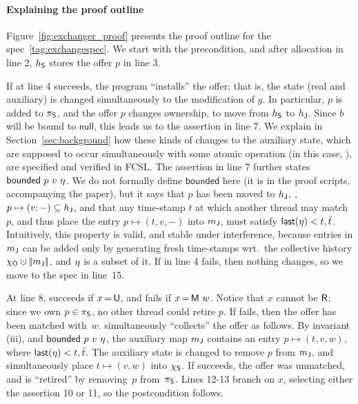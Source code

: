 %

\paragraph{Explaining the proof outline}

Figure~\ref{fig:exchanger_proof} presents the proof outline for the
spec~\eqref{tag:exchangespec}.
%
We start with the precondition, and after allocation in line 2,
$h_{\mathsf{S}}$ stores the offer $p$ in line 3.

If  at line 4 succeeds, the program ``installs'' the offer;
that is, the state (real and auxiliary) is changed simultaneously to
the modification of $g$. In particular, $p$ is added to $\pi_{\mathsf{S}}$, and
the offer $p$ changes ownership, to move from $h_{\mathsf{S}}$ to $h_{\mathsf{J}}$.
Since $b$ will be bound to $\mathsf{null}$, this leads us to the
assertion in line 7. We explain in Section~\ref{sec:background} how
these kinds of changes to the auxiliary state, which are supposed to
occur simultaneously with some atomic operation (in this case,
), are specified and verified in FCSL. The assertion in line
7 further states $\mathsf{bounded}\ p\ v\ \eta$. We do not formally
define $\mathsf{bounded}$ here (it is in the proof scripts,
accompanying the paper), but it says that $p$ has been moved to
$h_{\mathsf{J}}$, \ie, $p \mapsto (v; -) \subseteq h_{\mathsf{J}}$, and that any
time-stamp $t$ at which another thread may match $p$, and thus place
the entry $p \mapsto (t, v,-)$ into ${m_{\mathsf{J}}}$, must satisfy
$\mathsf{last}(\eta) < t, \bar{t}$. Intuitively, this property is
valid, and stable under interference, because entries in ${m_{\mathsf{J}}}$
can be added only by generating fresh time-stamps wrt.~the collective
history $\histo \hunion \mygather{\pending}$, and $\eta$ is a subset
of it.
%
If  in line 4 fails, then nothing changes, so we move to the
spec in line~15.

At line 8,  succeeds if $x\,{=}\,{\mathsf{U}}$, and fails if
$x\,{=}\,{\mathsf{M}\ w}$. Notice that $x$ cannot be ${\mathsf{R}}$; since we
own $p \in \pi_{\mathsf{S}}$, no other thread could retire $p$.
%
If  fails, then the offer has been matched with~$w$. 
simultaneously ``collects'' the offer as follows. By invariant (iii),
and $\mathsf{bounded}\ p\ v\ \eta$, the auxiliary map ${m_{\mathsf{J}}}$
contains an entry $p \mapsto (t, v, w)$, where $\mathsf{last}(\eta) <
t, \bar{t}$. The auxiliary state is changed to remove $p$ from
${m_{\mathsf{J}}}$, and simultaneously place $t \mapsto (v, w)$ into $\chi_{\mathsf{S}}$.
%
If  succeeds, the offer was unmatched, and is ``retired'' by
removing~$p$ from~$\pi_{\mathsf{S}}$.
%
Lines 12-13 branch on $x$, selecting either the assertion 10 or 11, so
the postcondition follows.

